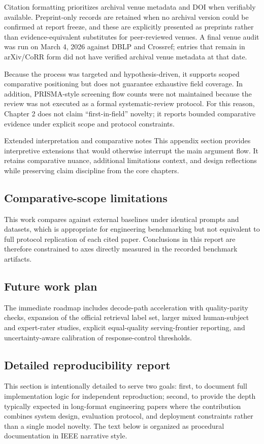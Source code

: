 ﻿\documentclass[a4paper,12pt]{article}
\makeatletter
\let\origsection\section
\renewcommand{\section}{%
  \@ifstar{\origsection*}{%
    \ifnum\value{section}>0
      \clearpage
      \thispagestyle{empty}\null\clearpage
    \else
      \clearpage
    \fi
    \origsection}%
}
\makeatother
\begin{document}
Citation formatting prioritizes archival venue metadata and DOI when verifiably available. Preprint-only records are retained when no archival version could be confirmed at report freeze, and these are explicitly presented as preprints rather than evidence-equivalent substitutes for peer-reviewed venues. A final venue audit was run on March 4, 2026 against DBLP and Crossref; entries that remain in arXiv/CoRR form did not have verified archival venue metadata at that date.

Because the process was targeted and hypothesis-driven, it supports scoped comparative positioning but does not guarantee exhaustive field coverage. In addition, PRISMA-style screening flow counts were not maintained because the review was not executed as a formal systematic-review protocol. For this reason, Chapter 2 does not claim ``first-in-field'' novelty; it reports bounded comparative evidence under explicit scope and protocol constraints.

\section{Extended interpretation and comparative notes}
This appendix section provides interpretive extensions that would otherwise interrupt the main argument flow. It retains comparative nuance, additional limitations context, and design reflections while preserving claim discipline from the core chapters.
\subsection{Comparative-scope limitations}
This work compares against external baselines under identical prompts and datasets, which is appropriate for engineering benchmarking but not equivalent to full protocol replication of each cited paper. Conclusions in this report are therefore constrained to axes directly measured in the recorded benchmark artifacts.

\subsection{Future work plan}
The immediate roadmap includes decode-path acceleration with quality-parity checks, expansion of the official retrieval label set, larger mixed human-subject and expert-rater studies, explicit equal-quality serving-frontier reporting, and uncertainty-aware calibration of response-control thresholds.

\subsection{Detailed reproducibility report}
This section is intentionally detailed to serve two goals: first, to document full implementation logic for independent reproduction; second, to provide the depth typically expected in long-format engineering papers where the contribution combines system design, evaluation protocol, and deployment constraints rather than a single model novelty. The text below is organized as procedural documentation in IEEE narrative style.
\end{document}
